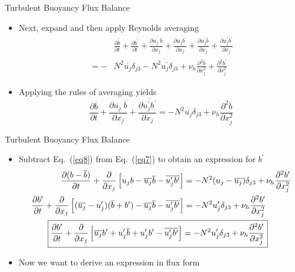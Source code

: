 \begin{frame}{Turbulent Buoyancy Flux Balance}
\begin{itemize}
  	\item Next, expand and then apply Reynolds averaging
  	\begin{align*}
  		&\frac{\partial \overline{\overline{b}}}{\partial t} + \frac{\partial \overline{b^\prime}}{\partial t} + \frac{\partial \overline{\overline{u_j}\; \overline{b}}}{\partial x_j} + \frac{\partial \overline{\overline{u_j} b^\prime}}{\partial x_j} + \frac{\partial \overline{u_j^\prime \overline{b}}}{\partial x_j} + \frac{\partial \overline{u_j^\prime b^\prime}}{\partial x_j}\\
  		=-&N^2\overline{\overline{u_j}}\delta_{j3} - N^2\overline{u_j^\prime} \delta_{j3} + \nu_{h} \frac{\partial^2 \overline{\overline{b}}}{\partial x_j^2} + \frac{\partial^2 \overline{b^\prime}}{\partial x_j^2}
  	\end{align*}
  	\item Applying the rules of averaging yields
  	\begin{equation}
  	\label{eq8}
  		\frac{\partial \overline{b}}{\partial t} + \frac{\partial \overline{u_j}\; \overline{b}}{\partial x_j} + \frac{\partial \overline{u_j^\prime b^\prime}}{\partial x_j} = -N^2\overline{u_j}\delta_{j3} + \nu_{h} \frac{\partial^2 \overline{b}}{\partial x_j^2}
  	\end{equation}
  \end{itemize}
\end{frame}
\begin{frame}{Turbulent Buoyancy Flux Balance}
\begin{itemize}
  	\item Subtract Eq.~(\ref{eq8}) from Eq.~(\ref{eq7}) to obtain an expression for $b^\prime$
  	\small
  	\begin{align}
  	\frac{\partial (b - \overline{b})}{\partial t} + \frac{\partial}{\partial x_j}\left[ u_j b - \overline{u_j}\overline{b} - \overline{u_j^\prime b^\prime}\right] &= -N^2(u_j - \overline{u_j})\delta_{j3} + \nu_h \frac{\partial^2 b^\prime}{\partial x_j^2}\nonumber\\
  	\frac{\partial b^\prime}{\partial t} + \frac{\partial}{\partial x_j}\left[(\overline{u_j} - u_j^\prime)(\overline{b}+b^\prime) - \overline{u_j}\overline{b} - \overline{u_j^\prime b^\prime}\right] &= -N^2 u_j^\prime \delta_{j3} + \nu_h \frac{\partial^2 b^\prime}{\partial x_j^2}\nonumber\\
  	\Aboxed{\frac{\partial b^\prime}{\partial t} + \frac{\partial}{\partial x_j}\left[\overline{u_j}b^\prime + u_j^\prime \overline{b} + u_j^\prime b^\prime - \overline{u_j^\prime b^\prime}\right] &= -N^2 u_j^\prime \delta_{j3} + \nu_h \frac{\partial^2 b^\prime}{\partial x_j^2}}
  	\label{eq9}
  	\end{align}
  	\item Now we want to derive an expression in flux form
  \end{itemize}
\end{frame}
